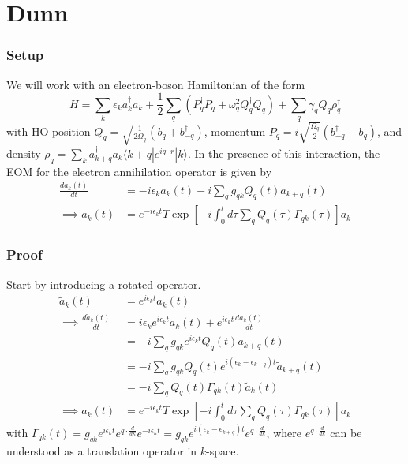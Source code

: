 
\section{Dunn}


\begin{frame}
    \frametitle{Setup}
We will work with an electron-boson Hamiltonian of the form
\begin{equation}
     H = \sum_k \epsilon_k a_k^\dagger a_k + \frac{1}{2} \sum_q (P_q^\dagger P_q + \omega_q^2 Q_q^\dagger Q_q) + \sum_{q} \gamma_q Q_q \rho_q^\dagger
\end{equation}
with HO position $Q_q= \sqrt{\frac{1}{2 \Omega_q}}\left(b_q+b_{-q}^{\dagger}\right)$, momentum $P_q=i \sqrt{\frac{\Omega_q}{2}}\left(b_{-q}^{\dagger}-b_q\right)$, and density $\rho_q=\sum_k a_{k+q}^{\dagger} a_k \langle k+q| e^{i q \cdot r}|k\rangle$.  In the presence of this interaction, the EOM for the electron annihilation operator is given by
\begin{align}
    \frac{d a_k(t)}{d t} &= -i \epsilon_k a_k(t) - i \sum_q g_{q k} Q_q(t) a_{k+q}(t) \\
\implies a_k(t) &= e^{-i \epsilon_k t} T \exp \left[-i \int_0^t d \tau \sum_q Q_q(\tau) \Gamma_{q k}(\tau)\right] a_k
\end{align} 
\end{frame}

\begin{frame}
    \frametitle{Proof}
Start by introducing a rotated operator.
\begin{align}
    \tilde{a}_k(t)&=e^{i \epsilon_k t} a_k(t) \\
\implies \frac{d \tilde{a}_k(t)}{d t}&=i \epsilon_k e^{i \epsilon_k t} a_k(t)+e^{i \epsilon_k t} \frac{d a_k(t)}{d t} \\
&=-i \sum_q g_{q k} e^{i \epsilon_k t} Q_q(t) a_{k+q}(t) \\
&=-i \sum_q g_{q k} Q_q(t) e^{i\left(\epsilon_k-\epsilon_{k+q}\right) t} \tilde{a}_{k+q}(t) \\
&= -i \sum_q Q_q(t) \Gamma_{q k}(t) \tilde{a}_k(t) \\
\implies a_k(t)&=e^{-i \epsilon_k t} T \exp \left[-i \int_0^t d \tau \sum_q Q_q(\tau) \Gamma_{q k}(\tau)\right] a_k
\end{align}
with $\Gamma_{q k}(t)=g_{q k} e^{i \epsilon_k t} e^{q \cdot \frac{d}{d k}} e^{-i \epsilon_k t} = g_{q k} e^{i\left(\epsilon_k-\epsilon_{k+q}\right) t} e^{q \cdot \frac{d}{d k}} $, where $e^{q \cdot \frac{d}{d k}}$ can be understood as a translation operator in $k$-space.


\end{frame}

